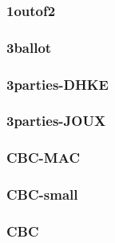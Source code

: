 

\begin{frame} \frametitle{1outof2}
\begin{figure}
\begin{center}

\end{center}
\end{figure}
\end{frame}
\begin{frame} \frametitle{3ballot}
\begin{figure}
\begin{center}

\end{center}
\end{figure}
\end{frame}
\begin{frame} \frametitle{3parties-DHKE}
\begin{figure}
\begin{center}

\end{center}
\end{figure}
\end{frame}
\begin{frame} \frametitle{3parties-JOUX}
\begin{figure}
\begin{center}

\end{center}
\end{figure}
\end{frame}
\begin{frame} \frametitle{CBC-MAC}
\begin{figure}
\begin{center}

\end{center}
\end{figure}
\end{frame}
\begin{frame} \frametitle{CBC-small}
\begin{figure}
\begin{center}

\end{center}
\end{figure}
\end{frame}
\begin{frame} \frametitle{CBC}
\begin{figure}
\begin{center}

\end{center}
\end{figure}
\end{frame}
